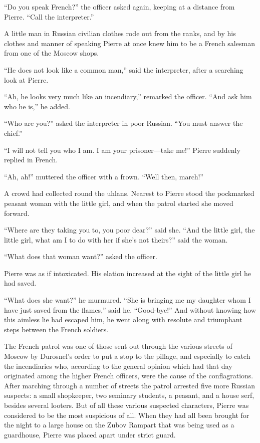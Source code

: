 ``Do you speak French?'' the officer asked again, keeping at a
distance from Pierre. ``Call the interpreter.''

A little man in Russian civilian clothes rode out from the ranks,
and by his clothes and manner of speaking Pierre at once knew him
to be a French salesman from one of the Moscow shops.

``He does not look like a common man,'' said the interpreter,
after a searching look at Pierre.

``Ah, he looks very much like an incendiary,'' remarked the
officer. ``And ask him who he is,'' he added.

``Who are you?'' asked the interpreter in poor Russian. ``You
must answer the chief.''

``I will not tell you who I am. I am your prisoner---take me!''
Pierre suddenly replied in French.

``Ah, ah!'' muttered the officer with a frown. ``Well then,
march!''

A crowd had collected round the uhlans. Nearest to Pierre stood
the pockmarked peasant woman with the little girl, and when the
patrol started she moved forward.

``Where are they taking you to, you poor dear?'' said she. ``And
the little girl, the little girl, what am I to do with her if
she's not theirs?''  said the woman.

``What does that woman want?'' asked the officer.

Pierre was as if intoxicated. His elation increased at the sight
of the little girl he had saved.

``What does she want?'' he murmured. ``She is bringing me my
daughter whom I have just saved from the flames,'' said
he. ``Good-bye!'' And without knowing how this aimless lie had
escaped him, he went along with resolute and triumphant steps
between the French soldiers.

The French patrol was one of those sent out through the various
streets of Moscow by Durosnel's order to put a stop to the
pillage, and especially to catch the incendiaries who, according
to the general opinion which had that day originated among the
higher French officers, were the cause of the
conflagrations. After marching through a number of streets the
patrol arrested five more Russian suspects: a small shopkeeper,
two seminary students, a peasant, and a house serf, besides
several looters. But of all these various suspected characters,
Pierre was considered to be the most suspicious of all. When they
had all been brought for the night to a large house on the Zubov
Rampart that was being used as a guardhouse, Pierre was placed
apart under strict guard.

